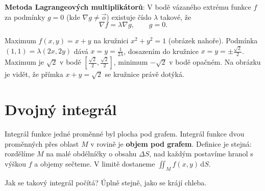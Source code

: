 \begin{center}
\end{center}

\begin{definitionbox}
  \textbf{Metoda Lagrangeových multiplikátorů}: V bodě vázaného extrému funkce $f$ za podmínky $g = 0$ (kde $\nabla g\neq\vec{o}$) existuje číslo $\lambda$ takové, že
  \begin{equation*}
    \nabla f = \lambda\nabla g,\qquad g = 0.
  \end{equation*}
\end{definitionbox}

\begin{example}
  Maximum $f(x, y) = x + y$ na kružnici $x^2 + y^2 = 1$ (obrázek nahoře). Podmínka $(1, 1) = \lambda(2x, 2y)$ dává $x = y = \frac{1}{2\lambda}$, dosazením do kružnice $x = y = \pm\frac{\sqrt{2}}{2}$. Maximum je $\sqrt{2}$ v bodě $\left[\frac{\sqrt{2}}{2}, \frac{\sqrt{2}}{2}\right]$, minimum $-\sqrt{2}$ v bodě opačném. Na obrázku je vidět, že přímka $x + y = \sqrt{2}$ se kružnice právě dotýká.
\end{example}

\section{Dvojný integrál}

Integrál funkce jedné proměnné byl plocha pod grafem. Integrál funkce dvou proměnných přes oblast $M$ v rovině je \textbf{objem pod grafem}. Definice je stejná: rozdělíme $M$ na malé obdélníčky o obsahu $\Delta S$, nad každým postavíme hranol s výškou $f$ a objemy sečteme. V limitě dostaneme $\iint_M f(x, y)\,\mathrm{d}S$.

Jak se takový integrál počítá? Úplně stejně, jako se krájí chleba.

